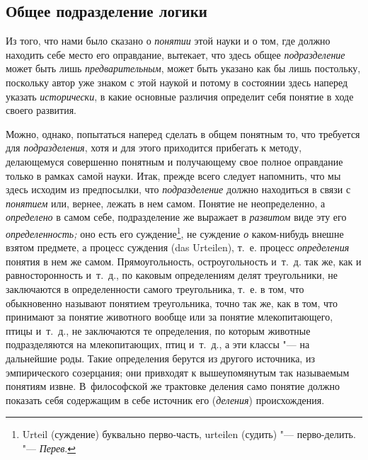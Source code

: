 \subsection[\hspace{8mm}Общее подразделение логики]{Общее подразделение логики}
Из того, что нами было сказано о
{\em понятии} этой науки и о том, где должно находить
себе место его оправдание, вытекает, что здесь общее
{\em подразделение} может быть лишь
{\em предварительным}, может быть указано как бы лишь
постольку, поскольку автор уже знаком с этой наукой и потому в состоянии
здесь наперед указать {\em исторически}, в какие
основные различия определит себя понятие в ходе своего развития.

Можно, однако, попытаться наперед сделать в общем понятным то, что требуется
для {\em подразделения}, хотя и для этого приходится
прибегать к методу, делающемуся совершенно понятным и получающему свое
полное оправдание только в рамках самой науки. Итак, прежде всего следует
напомнить, что мы здесь исходим из предпосылки, что
{\em подразделение} должно находиться в связи с
{\em понятием} или, вернее, лежать в нем самом. Понятие
не неопределенно, а {\em определено} в самом себе,
подразделение же выражает в {\em развитом} виде эту его
{\em определенность;} оно есть его суждение\footnote{
Urteil (суждение) буквально перво-часть, urteilen (судить) "--- перво-делить.
"--- {\em Перев}.}, не суждение {\em о} каком-нибудь
внешне взятом предмете, а процесс суждения (das Urteilen), т.~е. процесс
{\em определения} понятия в нем же самом.
Прямоугольность, остроугольность и~т.~д. так же, как и равносторонность
и~т.~д., по каковым определениям делят треугольники, не заключаются в
определенности самого треугольника, т.~е. в том, что обыкновенно называют
понятием треугольника, точно так же, как в том, что принимают за понятие
животного вообще или за понятие млекопитающего, птицы и~т.~д., не
заключаются те определения, по которым животные подразделяются на
млекопитающих, птиц и~т.~д., а эти классы "--- на дальнейшие роды. Такие
определения берутся из другого источника, из эмпирического созерцания; они
привходят к вышеупомянутым так называемым понятиям извне. В~философской же
трактовке деления само понятие должно показать себя содержащим в себе
источник его ({\em деления}) происхождения.

